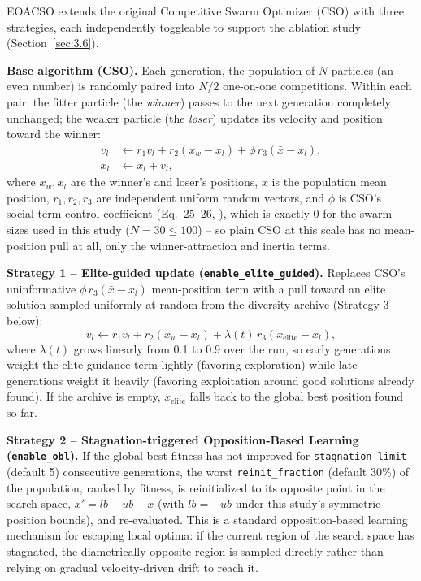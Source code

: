 EOACSO extends the original Competitive Swarm Optimizer (CSO)
\cite{Cheng:2015} with three strategies, each independently toggleable to
support the ablation study (Section~\ref{sec:3.6}).

\textbf{Base algorithm (CSO).} Each generation, the population of $N$
particles (an even number) is randomly paired into $N/2$ one-on-one
competitions. Within each pair, the fitter particle (the \emph{winner})
passes to the next generation completely unchanged; the weaker particle
(the \emph{loser}) updates its velocity and position toward the winner:
\begin{align}
  v_l &\leftarrow r_1 v_l + r_2 (x_w - x_l) + \phi \, r_3 (\bar{x} - x_l), \\
  x_l &\leftarrow x_l + v_l,
\end{align}
where $x_w, x_l$ are the winner's and loser's positions, $\bar{x}$ is the
population mean position, $r_1, r_2, r_3$ are independent uniform random
vectors, and $\phi$ is CSO's social-term control coefficient (Eq.\ 25--26,
\cite{Cheng:2015}), which is exactly 0 for the swarm sizes used in this
study ($N=30 \le 100$) -- so plain CSO at this scale has no mean-position
pull at all, only the winner-attraction and inertia terms.

\textbf{Strategy 1 -- Elite-guided update (\texttt{enable\_elite\_guided}).}
Replaces CSO's uninformative $\phi\,r_3(\bar{x}-x_l)$ mean-position term
with a pull toward an elite solution sampled uniformly at random from the
diversity archive (Strategy 3 below):
\begin{equation}
  v_l \leftarrow r_1 v_l + r_2 (x_w - x_l) + \lambda(t) \, r_3 (x_{\text{elite}} - x_l),
\end{equation}
where $\lambda(t)$ grows linearly from 0.1 to 0.9 over the run, so early
generations weight the elite-guidance term lightly (favoring
exploration) while late generations weight it heavily (favoring
exploitation around good solutions already found). If the archive is
empty, $x_{\text{elite}}$ falls back to the global best position found so
far.

\textbf{Strategy 2 -- Stagnation-triggered Opposition-Based Learning
(\texttt{enable\_obl}).} If the global best fitness has not improved for
\texttt{stagnation\_limit} (default 5) consecutive generations, the worst
\texttt{reinit\_fraction} (default 30\%) of the population, ranked by
fitness, is reinitialized to its opposite point in the search space,
$x' = lb + ub - x$ (with $lb=-ub$ under this study's symmetric position
bounds), and re-evaluated. This is a standard opposition-based learning
mechanism \cite{Tizhoosh:2005} for escaping local optima: if the current
region of the search space has stagnated, the diametrically opposite
region is sampled directly rather than relying on gradual
velocity-driven drift to reach it.

